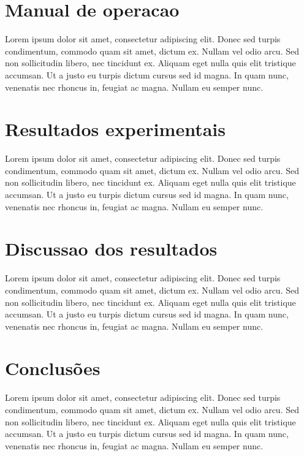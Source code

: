 \documentclass[12pt,twoside, a4paper, twocolumn]{article}
\begin{document}
\section{Manual de operacao}


Lorem ipsum dolor sit amet, consectetur adipiscing elit. Donec sed turpis condimentum, commodo quam sit amet, dictum ex. Nullam vel odio arcu. Sed non sollicitudin libero, nec tincidunt ex. Aliquam eget nulla quis elit tristique accumsan. Ut a justo eu turpis dictum cursus sed id magna. In quam nunc, venenatis nec rhoncus in, feugiat ac magna. Nullam eu semper nunc.

\section{Resultados experimentais}


Lorem ipsum dolor sit amet, consectetur adipiscing elit. Donec sed turpis condimentum, commodo quam sit amet, dictum ex. Nullam vel odio arcu. Sed non sollicitudin libero, nec tincidunt ex. Aliquam eget nulla quis elit tristique accumsan. Ut a justo eu turpis dictum cursus sed id magna. In quam nunc, venenatis nec rhoncus in, feugiat ac magna. Nullam eu semper nunc.


\section{Discussao dos resultados}

Lorem ipsum dolor sit amet, consectetur adipiscing elit. Donec sed turpis condimentum, commodo quam sit amet, dictum ex. Nullam vel odio arcu. Sed non sollicitudin libero, nec tincidunt ex. Aliquam eget nulla quis elit tristique accumsan. Ut a justo eu turpis dictum cursus sed id magna. In quam nunc, venenatis nec rhoncus in, feugiat ac magna. Nullam eu semper nunc.

\section{Conclusões}

Lorem ipsum dolor sit amet, consectetur adipiscing elit. Donec sed turpis condimentum, commodo quam sit amet, dictum ex. Nullam vel odio arcu. Sed non sollicitudin libero, nec tincidunt ex. Aliquam eget nulla quis elit tristique accumsan. Ut a justo eu turpis dictum cursus sed id magna. In quam nunc, venenatis nec rhoncus in, feugiat ac magna. Nullam eu semper nunc.
\end{document}
